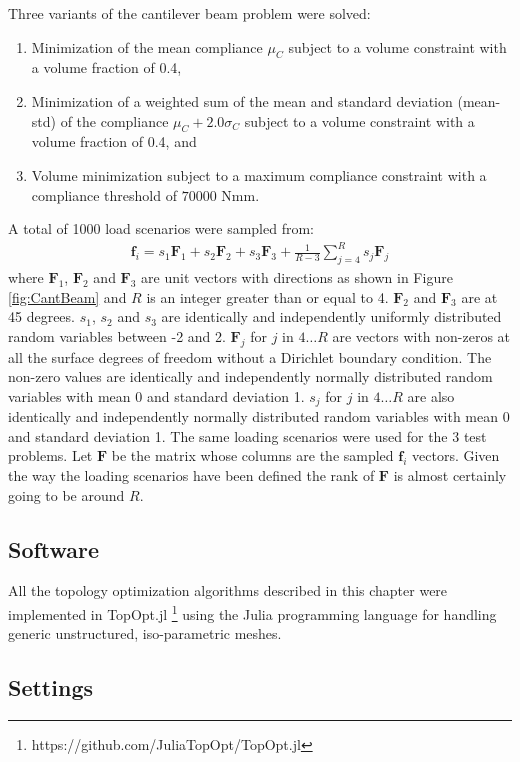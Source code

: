     Three variants of the cantilever beam problem were solved:
    \begin{enumerate}
      \item Minimization of the mean compliance $\mu_C$ subject to a volume constraint with a volume fraction of 0.4,
      \item Minimization of a weighted sum of the mean and standard deviation (mean-std) of the compliance $\mu_C + 2.0 \sigma_C$ subject to a volume constraint with a volume fraction of 0.4, and
      \item Volume minimization subject to a maximum compliance constraint with a compliance threshold of $70000 \text{ Nmm}$.
    \end{enumerate}
    A total of 1000 load scenarios were sampled from:
    \begin{align}
      \bm{f}_i = s_1 \bm{F}_1 + s_2 \bm{F}_2 + s_3 \bm{F}_3 + \frac{1}{R - 3} \sum_{j=4}^{R} s_j \bm{F}_j
    \end{align}
    where $\bm{F}_1$, $\bm{F}_2$ and $\bm{F}_3$ are unit vectors with directions as shown in Figure \ref{fig:CantBeam} and $R$ is an integer greater than or equal to 4. $\bm{F}_2$ and $\bm{F}_3$ are at 45 degrees. $s_1$, $s_2$ and $s_3$ are identically and independently uniformly distributed random variables between -2 and 2. $\bm{F}_j$ for $j$ in $4 \dots R$ are vectors with non-zeros at all the surface degrees of freedom without a Dirichlet boundary condition. The non-zero values are identically and independently normally distributed random variables with mean 0 and standard deviation 1. $s_j$ for $j$ in $4 \dots R$ are also identically and independently normally distributed random variables with mean 0 and standard deviation 1. The same loading scenarios were used for the 3 test problems. Let $\bm{F}$ be the matrix whose columns are the sampled $\bm{f}_i$ vectors. Given the way the loading scenarios have been defined the rank of $\bm{F}$ is almost certainly going to be around $R$.

  \subsection{Software}

    All the topology optimization algorithms described in this chapter were implemented in TopOpt.jl \footnote{https://github.com/JuliaTopOpt/TopOpt.jl} using the Julia programming language \citep{Bezanson2014} for handling generic unstructured, iso-parametric meshes.

  \subsection{Settings}


